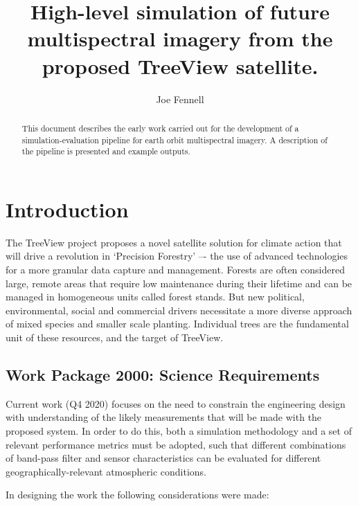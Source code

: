 \documentclass[10pt,a4paper,final,twocolumn]{article}
\author{Joe Fennell}
\title{High-level simulation of future multispectral imagery from the proposed TreeView satellite.}
\begin{document}
\maketitle
\begin{abstract}
This document describes the early work carried out for the development of a simulation-evaluation pipeline for earth orbit multispectral imagery. A description of the pipeline is presented and example outputs.
\end{abstract}
\section{Introduction}
The TreeView project proposes a novel satellite solution for climate action that will drive a revolution in ‘Precision Forestry’ –- the use of advanced technologies for a more granular data capture and management. Forests are often considered large, remote areas that require low maintenance during their lifetime and can be managed in homogeneous units called forest stands. But new political, environmental, social and commercial drivers necessitate a more diverse approach of mixed species and smaller scale planting. Individual trees are the fundamental unit of these resources, and the target of TreeView. 

\subsection{Work Package 2000: Science Requirements}
Current work (Q4 2020) focuses on the need to constrain the engineering design with understanding of the likely measurements that will be made with the proposed system. In order to do this, both a simulation methodology and a set of relevant performance metrics must be adopted, such that different combinations of band-pass filter and sensor characteristics can be evaluated for different geographically-relevant atmospheric conditions.

In designing the work the following considerations were made:
\end{document}
